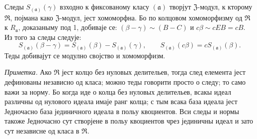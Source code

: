 \documentclass[11pt]{article}
\begin{document}
\setcounter{footnote}{26}

Следы $S_{(\mathfrak a)}(\gamma)$ взходно к фиксованому класу $(\mathfrak a)$ творјут $\mathfrak Z$-модул, к кторому $\mathfrak R$, појмана како $\mathfrak Z$-модул, јест хомоморфна. Бо по колцовом хомоморфизму од $\mathfrak R$ к $R_{\mathfrak a}$, доказаныму под 1, добиваје се: $(\beta-\gamma)\sim(B-C)$ и $c\beta\sim cEB=cB$. Из того за следы следује:
\[
        S_{(\mathfrak a)}(\beta-\gamma)=S_{(\mathfrak a)}(\beta)-S_{(\mathfrak a)}(\gamma),
        \qquad
        S_{(\mathfrak a)}(c\beta)=cS_{(\mathfrak a)}(\beta).
\]
Теды добивајут се модулно својство и хомоморфизм.

\emph{Приметка.} Ако $\mathfrak R$ јест колцо без нуловых делительев, тогда след елемента јест дефинованы независно од класа; можно теды говорити просто о следу; то само важи за норму. Бо когда иде о колца без нуловых делительев, всакы идеал различны од нулового идеала имаје ранг колца; с тым всака база идеала јест Једночасно база јединичного идеала в польу квоциентов. Вси следы и нормы такоже Једночасно сут створјене в польу квоциентов чрез јединичны идеал и зато сут независне од класа в $\mathfrak R$.
\end{document}
